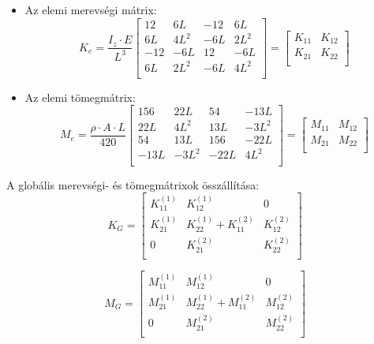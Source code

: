 \documentclass{article}
\begin{document}
	\begin{itemize}
		\item Az elemi merevségi mátrix:
		\begin{equation}
		K_e= \frac{I_{z} \cdot E}{L^3}  
		\begin{bmatrix}
		12&6L&-12&6L\\
		6L&4L^2&-6L&2L^2\\
		-12&-6L&12&-6L\\
		6L&2L^2&-6L&4L^2\\
		\end{bmatrix}
		=\begin{bmatrix}
		K_{11} &K_{12} \\
		K_{21} &K_{22} \\
		\end{bmatrix}
		\end{equation}
		
		\item Az elemi tömegmátrix:
		\begin{equation}
		M_e= \frac{\rho \cdot A \cdot L}{420}  
		\begin{bmatrix}
		156&22L&54&-13L\\
		22L&4L^2&13L&-3L^2\\
		54&13L&156&-22L\\
		-13L&-3L^2&-22L&4L^2\\
		\end{bmatrix}
		=\begin{bmatrix}
		M_{11} &M_{12} \\
		M_{21} &M_{22} \\
		\end{bmatrix}
		\end{equation}
	\end{itemize}
	
	A globális merevségi- és tömegmátrixok összállítása: 
	\begin{equation}
		K_G=
		\begin{bmatrix}
		K_{11}^{(1)} & K_{12}^{(1)}              & 0            \\
		K_{21}^{(1)} & K_{22}^{(1)}+K_{11}^{(2)} & K_{12}^{(2)} \\
		0            & K_{21}^{(2)}              & K_{22}^{(2)} \\
		\end{bmatrix}
	\end{equation}
	
	\begin{equation}
		M_G=
		\begin{bmatrix}
		M_{11}^{(1)} & M_{12}^{(1)}              & 0            \\
		M_{21}^{(1)} & M_{22}^{(1)}+M_{11}^{(2)} & M_{12}^{(2)} \\
		0            & M_{21}^{(2)}              & M_{22}^{(2)} \\
		\end{bmatrix}
	\end{equation}
	 
\end{document}
